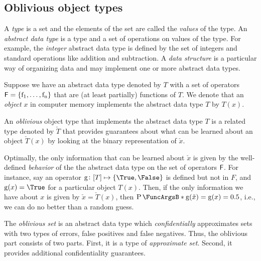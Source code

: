 \documentclass[ ../main.tex]{subfiles}
\begin{document}
\subsection{Oblivious object types}
A \emph{type} is a set and the elements of the set are called the \emph{values} of the type. An \emph{abstract data type} is a type and a set of operations on values of the type. For example, the \emph{integer} abstract data type is defined by the set of integers and standard operations like addition and subtraction. A \emph{data structure} is a particular way of organizing data and may implement one or more abstract data types.

Suppose we have an abstract data type denoted by $T$ with a set of operators $\Set{F} = \{ \operatorname{f_1},\ldots,\operatorname{f_n}\}$ that are (at least partially) functions of $T$. We denote that an \emph{object} $x$ in computer memory implements the abstract data type $T$ by $T(x)$.

An \emph{oblivious} object type\cite{obtype} that implements the abstract data type $T$ is a related type denoted by $\check{T}$ that provides guarantees about what can be learned about an object $\check{T}(x)$ by looking at the binary representation of $\check{x}$.

Optimally, the only information that can be learned about $\check{x}$ is given by the well-defined \emph{behavior} of the the abstract data type on the set of operators $\Set{F}$. For instance, say an operator $\operatorname{g} \colon [T] \mapsto \{\True,\False\}$ is defined but not in $F$, and $\operatorname{g}(x) = \True$ for a particular object $T(x)$. Then, if the only information we have about $x$ is given by $\check{x} = \check{T}(x)$, then $\Prob{\operatorname{g}(\check{x}) = \operatorname{g}(x)} = 0.5$, i.e., we can do no better than a random guess.


The \emph{oblivious set} is an abstract data type which \emph{confidentially} approximates sets with two types of errors, false positives and false negatives. Thus, the oblivious part consists of two parts. First, it is a type of \emph{approximate set}\cite{aset}. Second, it provides additional confidentiality guarantees.
\end{document}

